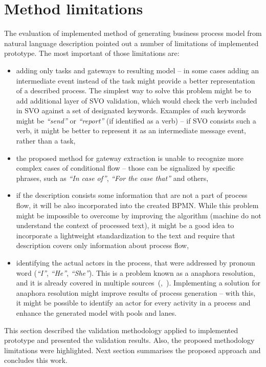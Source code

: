 \section{Method limitations}
The evaluation of implemented method of generating business process model from natural language description pointed out a number of limitations of implemented prototype. The most important of those limitations are:
\begin{itemize}
	\item adding only tasks and gateways to resulting model -- in some cases adding an intermediate event instead of the task might provide a better representation of a described process. The simplest way to solve this problem might be to add additional layer of SVO validation, which would check the verb included in SVO against a set of designated keywords. Examples of such keywords might be \emph{``send''} or \emph{``report''} (if identified as a verb) -- if SVO consists such a verb, it might be better to represent it as an intermediate message event, rather than a task,
	\item the proposed method for gateway extraction is unable to recognize more complex cases of conditional flow -- those can be signalized by specific phrases, such as \emph{``In case of''}, \emph{``For the case that''} and others,
	\item if the description consists some information that are not a part of process flow, it will be also incorporated into the created BPMN. While this problem might be impossible to overcome by improving the algorithm (machine do not understand the context of processed text), it might be a good idea to incorporate a lightweight standardization to the text and require that description covers only information about process flow,
	\item identifying the actual actors in the process, that were addressed by pronoun word (\emph{``I''}, \emph{``He''}, \emph{``She''}). This is a problem known as a anaphora resolution, and it is already covered in multiple sources~(\cite{anaphora-hale},~\cite{anaphora-kotek}). Implementing a solution for anaphora resolution might improve results of process generation -- with this, it might be possible to identify an actor for every activity in a process and enhance the generated model with pools and lanes.
\end{itemize}
This section described the validation methodology applied to implemented prototype and presented the validation results. Also, the proposed methodology limitations were highlighted. Next section summarises the proposed approach and concludes this work.